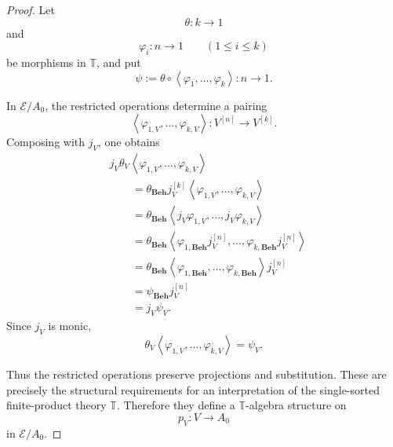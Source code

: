 \begin{proof}
    Let
    \[
        \theta:k\to1
    \]
    and
    \[
        \varphi_i:n\to1
        \qquad
        (1\leq i\leq k)
    \]
    be morphisms in \(\mathbb T\), and put
    \[
        \psi
        :=
        \theta
        \circ
        \left\langle
            \varphi_1,\dots,\varphi_k
        \right\rangle:
        n\to1.
    \]

    In \(\mathcal E/A_0\), the restricted operations determine a pairing
    \[
        \left\langle
            \varphi_{1,V},
            \dots,
            \varphi_{k,V}
        \right\rangle:
        V^{[n]}\to V^{[k]}.
    \]
    Composing with \(j_V\), one obtains
    \[
    \begin{aligned}
        &
        j_V
        \theta_V
        \left\langle
            \varphi_{1,V},
            \dots,
            \varphi_{k,V}
        \right\rangle
        \\
        &\qquad=
        \theta_{\mathbf{Beh}}
        j_V^{[k]}
        \left\langle
            \varphi_{1,V},
            \dots,
            \varphi_{k,V}
        \right\rangle
        \\
        &\qquad=
        \theta_{\mathbf{Beh}}
        \left\langle
            j_V\varphi_{1,V},
            \dots,
            j_V\varphi_{k,V}
        \right\rangle
        \\
        &\qquad=
        \theta_{\mathbf{Beh}}
        \left\langle
            \varphi_{1,\mathbf{Beh}}j_V^{[n]},
            \dots,
            \varphi_{k,\mathbf{Beh}}j_V^{[n]}
        \right\rangle
        \\
        &\qquad=
        \theta_{\mathbf{Beh}}
        \left\langle
            \varphi_{1,\mathbf{Beh}},
            \dots,
            \varphi_{k,\mathbf{Beh}}
        \right\rangle
        j_V^{[n]}
        \\
        &\qquad=
        \psi_{\mathbf{Beh}}j_V^{[n]}
        \\
        &\qquad=
        j_V\psi_V.
    \end{aligned}
    \]
    Since \(j_V\) is monic,
    \[
        \theta_V
        \left\langle
            \varphi_{1,V},
            \dots,
            \varphi_{k,V}
        \right\rangle
        =
        \psi_V.
    \]

    Thus the restricted operations preserve projections and substitution.
    These are precisely the structural requirements for an interpretation of
    the single-sorted finite-product theory \(\mathbb T\). Therefore they
    define a \(\mathbb T\)-algebra structure on
    \[
        p_V:V\to A_0
    \]
    in \(\mathcal E/A_0\).


\end{proof}
